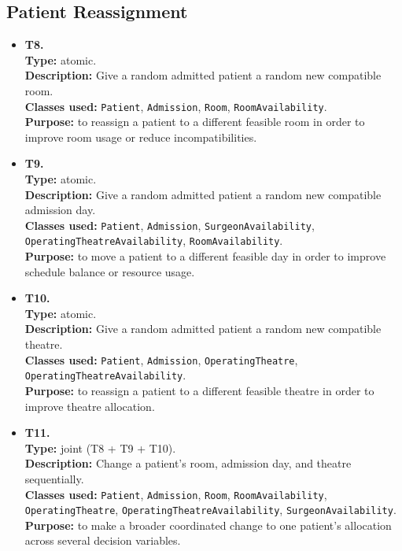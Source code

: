 \documentclass[10pt]{article}
\newcommand{\tlabel}[1]{{\large\bfseries #1}}
\begin{document}
\subsection{Patient Reassignment}
\begin{itemize}
    \item \tlabel{T8.}\\
    \textbf{Type:} atomic.\\
    \textbf{Description:} Give a random admitted patient a random new compatible room.\\
    \textbf{Classes used:} \texttt{Patient}, \texttt{Admission}, \texttt{Room}, \texttt{RoomAvailability}.\\
    \textbf{Purpose:} to reassign a patient to a different feasible room in order to improve room usage or reduce incompatibilities.
    
    \item \tlabel{T9.}\\
    \textbf{Type:} atomic.\\
    \textbf{Description:} Give a random admitted patient a random new compatible admission day.\\
    \textbf{Classes used:} \texttt{Patient}, \texttt{Admission}, \texttt{SurgeonAvailability}, \texttt{OperatingTheatreAvailability}, \texttt{RoomAvailability}.\\
    \textbf{Purpose:} to move a patient to a different feasible day in order to improve schedule balance or resource usage.
    
    \item \tlabel{T10.}\\
    \textbf{Type:} atomic.\\
    \textbf{Description:} Give a random admitted patient a random new compatible theatre.\\
    \textbf{Classes used:} \texttt{Patient}, \texttt{Admission}, \texttt{OperatingTheatre}, \texttt{OperatingTheatreAvailability}.\\
    \textbf{Purpose:} to reassign a patient to a different feasible theatre in order to improve theatre allocation.
    
    \item \tlabel{T11.}\\
    \textbf{Type:} joint (T8 + T9 + T10).\\
    \textbf{Description:} Change a patient's room, admission day, and theatre sequentially.\\
    \textbf{Classes used:} \texttt{Patient}, \texttt{Admission}, \texttt{Room}, \texttt{RoomAvailability}, \texttt{OperatingTheatre}, \texttt{OperatingTheatreAvailability}, \texttt{SurgeonAvailability}.\\
    \textbf{Purpose:} to make a broader coordinated change to one patient’s allocation across several decision variables.
    

\end{itemize}
\end{document}
